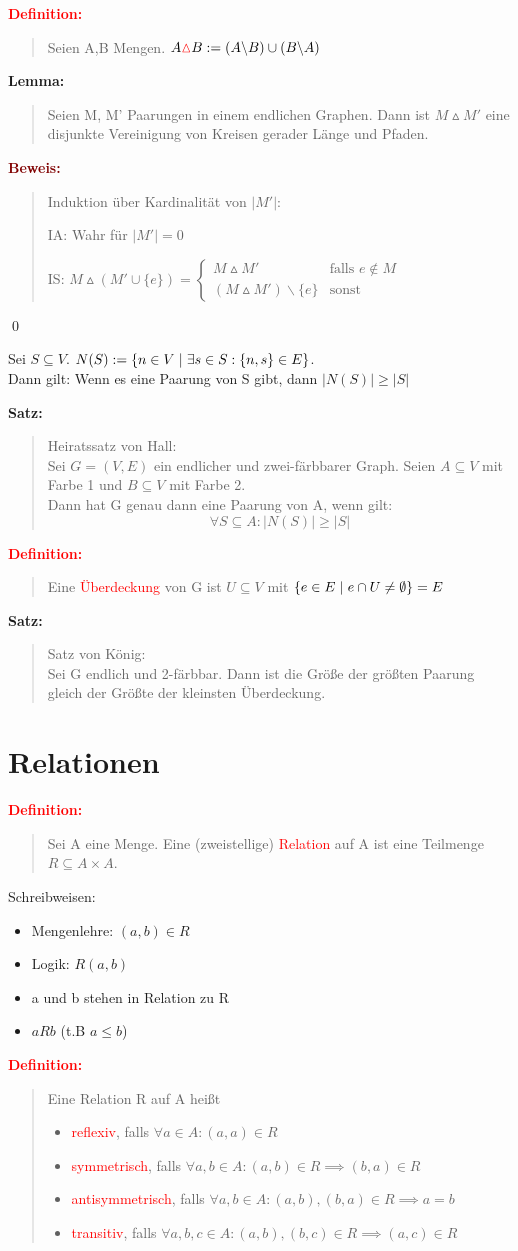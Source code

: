 \documentclass{article}
\newcommand{\smsp}{\phantom{\hspace{3px}}}
\newcommand{\red}[1]{\textcolor{red}{#1}}
\newcommand{\dgr}[1]{\textcolor{dgr}{#1}}
\newcommand{\maroon}[1]{\textcolor{maroon}{#1}}
\newcommand{\de}[1]{\red{\textbf{Definition: }}\begin{quote}#1\end{quote}}
\newcommand{\se}[1]{\dgr{\textbf{Satz: }}\begin{quote}#1\end{quote}}
\newcommand{\lem}[1]{\dgr{\textbf{Lemma: }}\begin{quote}#1\end{quote}}
\newcommand{\pr}[1]{\maroon{\textbf{Beweis: }}\begin{quote}#1\end{quote}\qed}
\renewcommand{\st}{\smsp | \smsp}
\newcommand{\xor}{\mathbin{\vartriangle}}
\newcommand{\bs}{\backslash}
\begin{document}
\de{
    Seien A,B Mengen. $A \red{\xor} B := (A \bs B) \cup (B \bs A)$
}

\lem{
    Seien M, M' Paarungen in einem endlichen Graphen. Dann ist $M \xor M'$ eine disjunkte Vereinigung von Kreisen gerader Länge und Pfaden.
}
\pr{
    Induktion über Kardinalität von $|M'|$:

    IA: Wahr für $|M'| = 0$

    IS: $M \xor (M' \cup \{e\}) = \begin{cases}
        M \xor M' & \text{falls $e \notin M$}\\
        (M \xor M') \bs \{e\} & \text{sonst}
    \end{cases}$
}

Sei $S \subseteq V$. $N(S) := \{n \in V \st \exists s \in S: \{n,s\} \in E\}$.\\
Dann gilt: Wenn es eine Paarung von S gibt, dann $|N(S)| \ge |S|$

\se{
    Heiratssatz von Hall:\\
    Sei $G=(V,E)$ ein endlicher und zwei-färbbarer Graph. Seien $A \subseteq V$ mit Farbe 1 und $B \subseteq V$ mit Farbe 2.\\
    Dann hat G genau dann eine Paarung von A, wenn gilt:
    \[
        \forall S \subseteq A: |N(S)| \ge |S|
    \]
}

\de{
    Eine \red{Überdeckung} von G ist $U \subseteq V$ mit $\{e \in E \st e \cap U \ne \emptyset\} = E$
}

\se{
    Satz von König:\\
    Sei G endlich und 2-färbbar. Dann ist die Größe der größten Paarung gleich der Größte der kleinsten Überdeckung.
}

\newpage
\section{Relationen}

\de{
    Sei A eine Menge. Eine (zweistellige) \red{Relation} auf A ist eine Teilmenge $R \subseteq A \times A$.
}

Schreibweisen:
\begin{itemize}
    \item Mengenlehre: $(a,b) \in R$
    \item Logik: $R(a,b)$
    \item a und b stehen in Relation zu R
    \item $aRb$ (t.B $a \le b$)
\end{itemize}

\de{
    Eine Relation R auf A heißt
    \begin{itemize}
        \item \red{reflexiv}, falls $\forall a \in A: (a,a) \in R$
        \item \red{symmetrisch}, falls $\forall a,b \in A: (a,b) \in R \implies (b,a) \in R$
        \item \red{antisymmetrisch}, falls $\forall a,b \in A: (a,b), (b,a) \in R \implies a = b$
        \item \red{transitiv}, falls $\forall a,b,c \in A: (a,b), (b,c) \in R \implies (a,c) \in R$
    \end{itemize}
}
\end{document}
